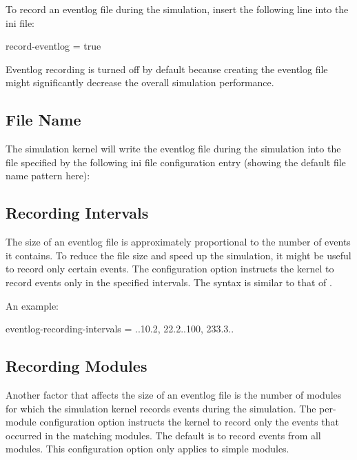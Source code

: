 To record an eventlog file during the simulation, insert the following line into the ini file:

\begin{inifile}
record-eventlog = true
\end{inifile}

\begin{note}
    Eventlog recording is turned off by default because creating the eventlog
    file might significantly decrease the overall simulation performance.
\end{note}

\subsection{File Name}
\label{sec:eventlog:file-name}

The simulation kernel will write the eventlog file during the simulation into
the file specified by the following ini file configuration entry (showing the
default file name pattern here):


\subsection{Recording Intervals}
\label{sec:eventlog:recording-intervals}

The size of an eventlog file is approximately proportional to the number of
events it contains. To reduce the file size and speed up the simulation, it
might be useful to record only certain events. The
 configuration option instructs the kernel to
record events only in the specified intervals. The syntax is similar to that of
.

An example:

\begin{inifile}
eventlog-recording-intervals = ..10.2, 22.2..100, 233.3..
\end{inifile}

\subsection{Recording Modules}
\label{sec:eventlog:recording-modules}

Another factor that affects the size of an eventlog file is the number of
modules for which the simulation kernel records events during the simulation.
The  per-module configuration option instructs
the kernel to record only the events that occurred in the matching modules. The
default is to record events from all modules. This configuration option only
applies to simple modules.

